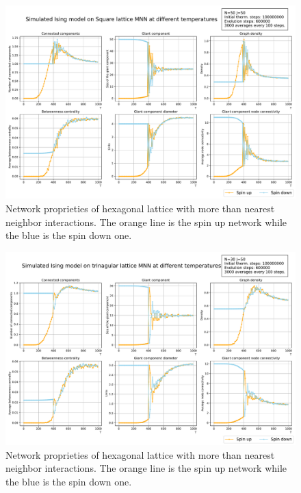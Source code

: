\begin{figure}[!htb]
  \centering
  \includegraphics[width=\linewidth]{Network meausres/MNN_Square.pdf}
    \caption{Network proprieties of hexagonal lattice with more than nearest neighbor interactions. The orange line is the spin up network while the blue is the spin down one.}
    \label{Fig:MNN1}
\end{figure}
\begin{figure}[!h]
  \centering
  \includegraphics[width=\linewidth]{Network meausres/MNN_Triang.pdf}
    \caption{Network proprieties of hexagonal lattice with more than nearest neighbor interactions. The orange line is the spin up network while the blue is the spin down one.}
    \label{Fig:MNN2}
\end{figure}
